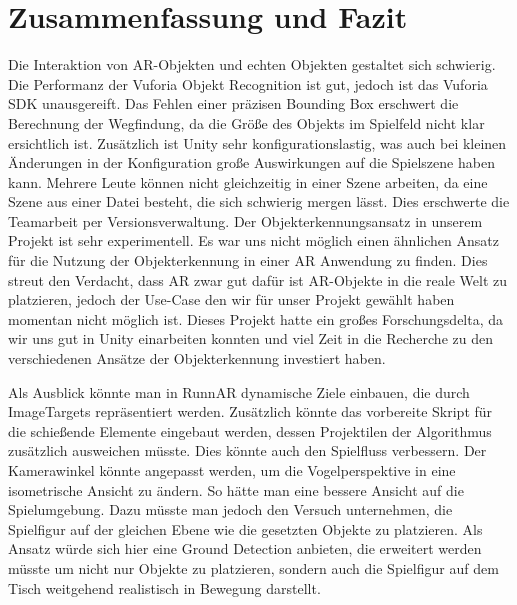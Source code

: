 \chapter{Zusammenfassung und Fazit}

Die Interaktion von AR-Objekten und echten Objekten gestaltet sich schwierig. Die Performanz der Vuforia Objekt Recognition ist gut, jedoch ist das Vuforia SDK unausgereift. Das Fehlen einer präzisen Bounding Box erschwert die Berechnung der Wegfindung, da die Größe des Objekts im Spielfeld nicht klar ersichtlich ist. Zusätzlich ist Unity sehr konfigurationslastig, was auch bei kleinen Änderungen in der Konfiguration große Auswirkungen auf die Spielszene haben kann.  Mehrere Leute können nicht gleichzeitig in einer Szene arbeiten, da eine Szene aus einer Datei besteht, die sich schwierig mergen lässt. Dies erschwerte die Teamarbeit per Versionsverwaltung. Der Objekterkennungsansatz in unserem Projekt ist sehr experimentell. Es war uns nicht möglich einen ähnlichen Ansatz für die Nutzung der Objekterkennung in einer AR Anwendung zu finden. Dies streut den Verdacht, dass AR zwar gut dafür ist AR-Objekte in die reale Welt zu platzieren, jedoch der Use-Case den wir für unser Projekt gewählt haben momentan nicht möglich ist. Dieses Projekt hatte ein großes Forschungsdelta, da wir uns gut in Unity einarbeiten konnten und viel Zeit in die Recherche zu den verschiedenen Ansätze der Objekterkennung investiert haben. 


Als Ausblick könnte man in RunnAR dynamische Ziele einbauen, die durch ImageTargets repräsentiert werden. Zusätzlich könnte das vorbereite Skript für die schießende Elemente eingebaut werden, dessen Projektilen der Algorithmus zusätzlich ausweichen müsste. Dies könnte auch den Spielfluss verbessern. Der Kamerawinkel könnte angepasst werden, um die Vogelperspektive in eine isometrische Ansicht zu ändern. So hätte man eine bessere Ansicht auf die Spielumgebung. Dazu müsste man jedoch den Versuch unternehmen, die Spielfigur auf der gleichen Ebene wie die gesetzten Objekte zu platzieren. Als Ansatz würde sich hier eine Ground Detection anbieten, die erweitert werden müsste um nicht nur Objekte zu platzieren, sondern auch die Spielfigur auf dem Tisch weitgehend realistisch in Bewegung darstellt.